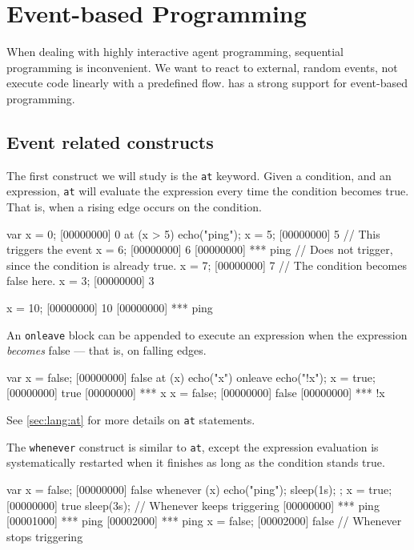 \chapter{Event-based Programming}
\label{sec:tut:event-prog}

When dealing with highly interactive agent programming, sequential
programming is inconvenient. We want to react to external, random
events, not execute code linearly with a predefined flow. \us has a
strong support for event-based programming.

\section{Event related constructs}

The first construct we will study is the \lstinline|at| keyword. Given
a condition, and an expression, \lstinline|at| will evaluate the
expression every time the condition becomes true. That is,
when a rising edge occurs on the condition.

\begin{urbiscript}
var x = 0;
[00000000] 0
at (x > 5)
  echo("ping");
x = 5;
[00000000] 5
// This triggers the event
x = 6;
[00000000] 6
[00000000] *** ping
// Does not trigger, since the condition is already true.
x = 7;
[00000000] 7
// The condition becomes false here.
x = 3;
[00000000] 3

x = 10;
[00000000] 10
[00000000] *** ping
\end{urbiscript}

An \lstinline|onleave| block can be appended to execute an expression
when the expression \emph{becomes} false --- that is, on falling edges.

\begin{urbiscript}
var x = false;
[00000000] false
at (x)
  echo("x")
onleave
  echo("!x");
x = true;
[00000000] true
[00000000] *** x
x = false;
[00000000] false
[00000000] *** !x
\end{urbiscript}

See \autoref{sec:lang:at} for more details on \lstinline|at|
statements.

The \lstinline|whenever| construct is similar to \lstinline|at|,
except the expression evaluation is systematically restarted when it
finishes as long as the condition stands true.

\begin{urbiscript}
var x = false;
[00000000] false
whenever (x)
{
  echo("ping");
  sleep(1s);
};
x = true;
[00000000] true
sleep(3s);
// Whenever keeps triggering
[00000000] *** ping
[00001000] *** ping
[00002000] *** ping
x = false;
[00002000] false
// Whenever stops triggering
\end{urbiscript}

